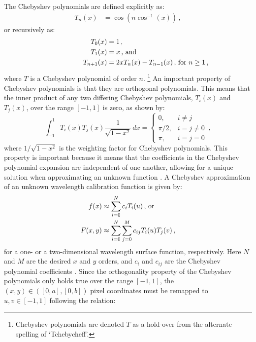 The Chebyshev polynomials are defined explicitly as:
\begin{align} \label{eq:chebypolyexplicit}
    T_{n}(x) &= \cos(n \cos^{-1}(x))\,,
\end{align}
or recursively as:
\begin{align}
    T_{0}(x) &= 1 \,,\notag\\
    T_{1}(x) &= x \rlap{\,,\ and} \label{eq:chebypoly}\\
    T_{n+1}(x) &= 2xT_n(x) - T_{n-1}(x) \rlap{\,,\ for $n \geq 1$\,,}\notag
\end{align}
where $T$ is a Chebyshev polynomial of order $n$.%
\footnote{Chebyshev polynomials are denoted $T$ as a hold-over from the alternate spelling of `Tchebycheff'.}
An important property of Chebyshev polynomials is that they are orthogonal polynomials. This means that the inner product of any two differing Chebyshev polynomials, $T_{i}(x)$ and $T_{j}(x)$, over the range $[-1, 1]$ is zero, as shown by:
\begin{equation} \label{eq:chebyorth}
    \int_{-1}^{1} T_{i}(x) T_{j}(x) \frac{1}{\sqrt{1-x^{2}}} \,dx =
    \begin{cases}
        0,       & i \neq j     \\
        \pi / 2, & i = j \neq 0 \\
        \pi,     & i = j = 0
    \end{cases}\,,
\end{equation}
where $1 / \sqrt{1 - x^{2}}$ is the weighting factor for Chebyshev polynomials. This property is important because it means that the coefficients in the Chebyshev polynomial expansion are independent of one another, allowing for a unique solution when approximating an unknown function \citep{numerical_recipes, cheby}. A Chebyshev approximation of an unknown wavelength calibration function is given by:
\begin{align} \label{eq:chebyshev}
    f(x) &\approx \sum_{i = 0}^{N}  c_{i} T_{i}(u)\rlap{\,,\ or}\\
    F(x, y) &\approx \sum_{i = 0}^{N} \sum_{j = 0}^{M} c_{ij} T_{i}(u) T_{j}(v)\,,\label{eq:chebyshev2D}
\end{align}
for a one- or a two-dimensional wavelength surface function, respectively. Here $N$ and $M$ are the desired $x$ and $y$ orders, and $c_{i}$ and $c_{ij}$ are the Chebyshev polynomial coefficients \citep{chebysurf, cheby2d}. Since the orthogonality property of the Chebyshev polynomials only holds true over the range $[-1, 1]$, the $(x, y) \in ([0, a], [0, b])$ pixel coordinates must be remapped to $u, v \in [-1, 1]$ following the relation:
